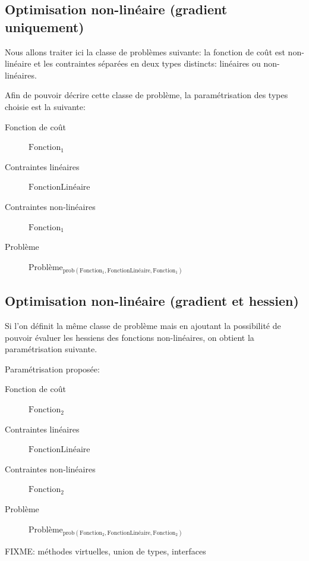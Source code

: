 \subsection{Optimisation non-linéaire (gradient uniquement)}

Nous allons traiter ici la classe de problèmes suivante: la fonction
de coût est non-linéaire et les contraintes séparées en deux types
distincts: linéaires ou non-linéaires.

\begin{myexample}\label{ex:chap1_cfsqp}
  Afin de pouvoir décrire cette classe de problème, la paramétrisation des types choisie est la suivante:
  \begin{description}
  \item[Fonction de coût] $\text{Fonction}_1$
  \item[Contraintes linéaires] $\text{FonctionLinéaire}$
  \item[Contraintes non-linéaires] $\text{Fonction}_1$
  \item[Problème] $\text{Problème}_{\text{prob}(\text{Fonction}_1, \text{FonctionLinéaire}, \text{Fonction}_1)}$
  \end{description}
\end{myexample}

\subsection{Optimisation non-linéaire (gradient et hessien)}

Si l'on définit la même classe de problème mais en ajoutant la
possibilité de pouvoir évaluer les hessiens des fonctions
non-linéaires, on obtient la paramétrisation suivante.

\begin{myexample}\label{ex:chap1_ipopt}
  Paramétrisation proposée:
  \begin{description}
  \item[Fonction de coût] $\text{Fonction}_2$
  \item[Contraintes linéaires] $\text{FonctionLinéaire}$
  \item[Contraintes non-linéaires] $\text{Fonction}_2$
  \item[Problème] $\text{Problème}_{\text{prob}(\text{Fonction}_2, \text{FonctionLinéaire}, \text{Fonction}_2)}$
  \end{description}
\end{myexample}

FIXME:  méthodes virtuelles, union de types, interfaces


